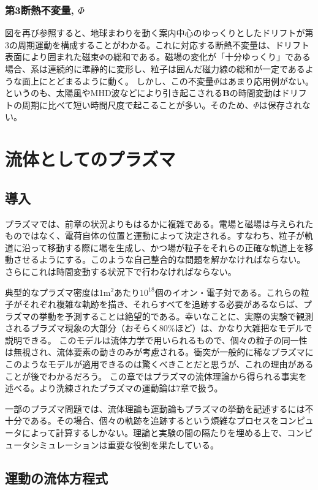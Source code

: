 \documentclass{ltjsarticle}
\numberwithin{equation}{section} %
\begin{document}
\subsubsection{第3断熱不変量, $\Phi$}
図を再び参照すると、地球まわりを動く案内中心のゆっくりとしたドリフトが第3の周期運動を構成することがわかる。これに対応する断熱不変量は、ドリフト表面により囲まれた磁束$\Phi$の総和である。磁場の変化が「十分ゆっくり」である場合、系は連続的に準静的に変形し、粒子は囲んだ磁力線の総和が一定であるような面上にとどまるように動く。
しかし、この不変量$\Phi$はあまり応用例がない。というのも、太陽風やMHD波などにより引き起こされる$\bm{B}$の時間変動はドリフトの周期に比べて短い時間尺度で起こることが多い。そのため、$\Phi$は保存されない。



\section{流体としてのプラズマ}
\subsection{導入}
プラズマでは、前章の状況よりもはるかに複雑である。電場と磁場は与えられたものではなく、電荷自体の位置と運動によって決定される。すなわち、粒子が軌道に沿って移動する際に場を生成し、かつ場が粒子をそれらの正確な軌道上を移動させるようにする。このような自己整合的な問題を解かなければならない。さらにこれは時間変動する状況下で行わなければならない。

典型的なプラズマ密度は1$\si{\metre^2}$あたり$10^{18}$個のイオン・電子対である。これらの粒子がそれぞれ複雑な軌跡を描き、それらすべてを追跡する必要があるならば、プラズマの挙動を予測することは絶望的である。幸いなことに、実際の実験で観測されるプラズマ現象の大部分（おそらく80\%ほど）は、かなり大雑把なモデルで説明できる。
このモデルは流体力学で用いられるもので、個々の粒子の同一性は無視され、流体要素の動きのみが考慮される。衝突が一般的に稀なプラズマにこのようなモデルが適用できるのは驚くべきことだと思うが、これの理由があることが後でわかるだろう。
この章ではプラズマの流体理論から得られる事実を述べる。より洗練されたプラズマの運動論は7章で扱う。

一部のプラズマ問題では、流体理論も運動論もプラズマの挙動を記述するには不十分である。その場合、個々の軌跡を追跡するという煩雑なプロセスをコンピュータによって計算するしかない。理論と実験の間の隔たりを埋める上で、コンピュータシミュレーションは重要な役割を果たしている。

\subsection{運動の流体方程式}
\end{document}
